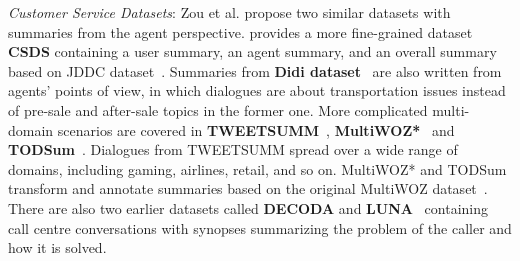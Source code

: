 \textit{Customer Service Datasets}: Zou et al. propose two similar datasets with summaries from the agent perspective.
\citet{lin2021csds} provides a more fine-grained dataset \textbf{CSDS} containing a user summary, an agent summary, and an overall summary based on JDDC dataset~\cite{chen2020jddc}. %
Summaries from \textbf{Didi dataset}~\cite{liu2019automatic} are also written from agents' points of view, in which dialogues are about transportation issues instead of pre-sale and after-sale topics in the former one.
More complicated multi-domain scenarios are covered in \textbf{TWEETSUMM}~\cite{feigenblat-etal-2021-tweetsumm-dialog}, \textbf{MultiWOZ*}~\cite{yuan2019scaffolds} and \textbf{TODSum}~\cite{zhao2021todsum}. Dialogues from TWEETSUMM spread over a wide range of domains, including gaming, airlines, retail, and so on. 
MultiWOZ* and TODSum transform and annotate summaries based on the original MultiWOZ dataset~\cite{eric2019multiwoz}.
There are also two earlier datasets called \textbf{DECODA} and \textbf{LUNA}~\cite{favre2015call} containing call centre conversations with synopses summarizing the problem of the caller and how it is solved.  




